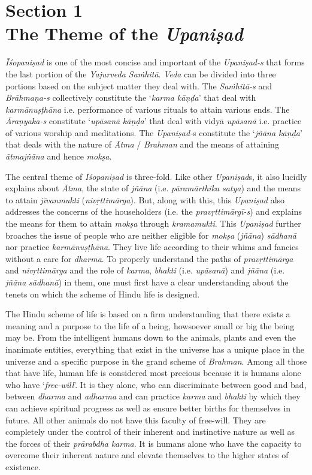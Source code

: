 \chapter{\textbf{Section 1\\ The Theme of the \emph{Upaniṣad}}}

\emph{Īśopaniṣad} is one of the most concise and important of the \emph{Upaniṣad-s} that forms the last portion of the \emph{Yajurveda Saṁhitā}. \emph{Veda} can be divided into three portions based on the subject matter they deal with. The \emph{Saṁhitā-s} and \emph{Brāhmaṇa-s} collectively constitute the `\emph{karma kāṇḍa}' that deal with \emph{karmānuṣṭhāna} i.e. performance of various rituals to attain various ends. The \emph{Āraṇyaka-s} constitute `\emph{upāsanā} \emph{kāṇḍa}' that deal with vidyā \emph{upāsanā} i.e. practice of various worship and meditations. The \emph{Upaniṣad-}s constitute the `\emph{jñāna kāṇḍa}' that deals with the nature of \emph{Ātma} / \emph{Brahman} and the means of attaining \emph{ātmajñāna} and hence \emph{mokṣa}.

The central theme of \emph{Īśopaniṣad} is three-fold. Like other \emph{Upaniṣad}s, it also lucidly explains about \emph{Ātma}, the state of \emph{jñāna} (i.e. \emph{pāramārthika} \emph{satya}) and the means to attain \emph{jīvanmukti} (\emph{nivṛttimārga}). But, along with this, this \emph{Upaniṣad} also addresses the concerns of the householders (i.e. the \emph{pravṛttimārgī-s}) and explains the means for them to attain \emph{mokṣa} through \emph{kramamukti}. This \emph{Upaniṣad} further broaches the issue of people who are neither eligible for \emph{mokṣa} (\emph{jñāna}) \emph{sādhanā} nor practice \emph{karmānuṣṭhāna}. They live life according to their whims and fancies without a care for \emph{dharma}. To properly understand the paths of \emph{pravṛttimārga} and \emph{nivṛttimārga} and the role of \emph{karma}, \emph{bhakti} (i.e. \emph{upāsanā}) and \emph{jñāna} (i.e. \emph{jñāna} \emph{sādhanā}) in them, one must first have a clear understanding about the tenets on which the scheme of Hindu life is designed.

The Hindu scheme of life is based on a firm understanding that there exists a meaning and a purpose to the life of a being, howsoever small or big the being may be. From the intelligent humans down to the animals, plants and even the inanimate entities, everything that exist in the universe has a unique place in the universe and a specific purpose in the grand scheme of \emph{Brahman}. Among all those that have life, human life is considered most precious because it is humans alone who have `\emph{free-will}'. It is they alone, who can discriminate between good and bad, between \emph{dharma} and \emph{adharma} and can practice \emph{karma} and \emph{bhakti} by which they can achieve spiritual progress as well as ensure better births for themselves in future. All other animals do not have this faculty of free-will. They are completely under the control of their inherent and instinctive nature as well as the forces of their \emph{prārabdha} \emph{karma}. It is humans alone who have the capacity to overcome their inherent nature and elevate themselves to the higher states of existence.

